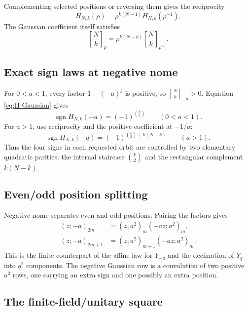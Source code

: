 \documentclass[11pt,oneside]{article}
\numberwithin{equation}{section}
\theoremstyle{definition}
\theoremstyle{remark}
\newcommand{\sgn}{\operatorname{sgn}}
\newcommand{\qbinom}[3]{\genfrac{[}{]}{0pt}{}{#1}{#2}_{#3}}
\begin{document}
Complementing selected positions or reversing them gives the reciprocity
\begin{equation}
 \boxed{
 H_{N,k}(\rho)=\rho^{k(N-1)}H_{N,k}(\rho^{-1}).}
 \label{eq:H-reciprocity}
\end{equation}
The Gaussian coefficient itself satisfies
\begin{equation}
 \qbinom{N}{k}{\rho}
 =\rho^{k(N-k)}\qbinom{N}{k}{\rho^{-1}}.
 \label{eq:qbinom-reciprocity}
\end{equation}

\subsection{Exact sign laws at negative nome}

For $0<a<1$, every factor $1-(-a)^j$ is positive, so
$\qbinom{N}{k}{-a}>0$.  Equation \eqref{eq:H-Gaussian} gives
\begin{equation}
 \boxed{
 \sgn H_{N,k}(-a)=(-1)^{\binom k2}
 \qquad(0<a<1).}
 \label{eq:H-sign-inside}
\end{equation}
For $a>1$, use reciprocity and the positive coefficient at $-1/a$:
\begin{equation}
 \boxed{
 \sgn H_{N,k}(-a)=
 (-1)^{\binom k2+k(N-k)}
 \qquad(a>1).}
 \label{eq:H-sign-outside}
\end{equation}
Thus the four signs in each requested orbit are controlled by two elementary
quadratic parities: the internal staircase $\binom k2$ and the rectangular
complement $k(N-k)$.

\subsection{Even/odd position splitting}

Negative nome separates even and odd positions.  Pairing the factors gives
\begin{align}
 (z;-a)_{2m}&=(z;a^2)_m(-az;a^2)_m,
 \label{eq:negative-Pochhammer-even}\\
 (z;-a)_{2m+1}&=(z;a^2)_{m+1}(-az;a^2)_m.
 \label{eq:negative-Pochhammer-odd}
\end{align}
This is the finite counterpart of the affine law for $Y_{-a}$ and the
decimation of $Y_q$ into $q^2$ components.  The negative Gaussian row is a
convolution of two positive $a^2$ rows, one carrying an extra sign and one
possibly an extra position.

\subsection{The finite-field/unitary square}
\end{document}
